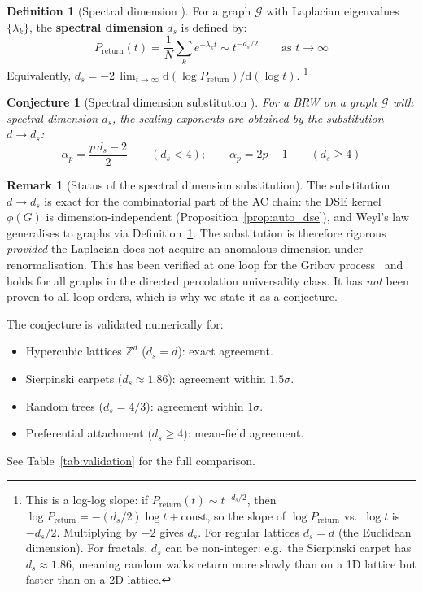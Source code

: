 \documentclass[11pt,a4paper]{article}
\newtheorem{conjecture}[theorem]{Conjecture}
\theoremstyle{definition}
\newtheorem{definition}[theorem]{Definition}
\newtheorem*{remark}{Remark}
\newcommand{\dd}{\mathrm{d}}
\newcommand{\Preturn}{P_{\mathrm{return}}}
\begin{document}
\begin{definition}[Spectral dimension {\cite{burioni2005}}]
\label{def:spectral_dim}
For a graph $\mathcal{G}$ with Laplacian eigenvalues $\{\lambda_k\}$,
the \textbf{spectral dimension} $d_s$ is defined by:
\begin{equation}
\Preturn(t) = \frac{1}{N}\sum_k e^{-\lambda_k t} \sim t^{-d_s/2}
\qquad\text{as } t \to \infty
\end{equation}
Equivalently, $d_s = -2\, \lim_{t \to \infty} \dd(\log \Preturn)/\dd(\log t)$.%
\footnote{This is a log-log slope: if $\Preturn(t) \sim t^{-d_s/2}$,
then $\log \Preturn = -(d_s/2)\log t + \mathrm{const}$, so the slope
of $\log \Preturn$ vs.\ $\log t$ is $-d_s/2$. Multiplying by $-2$ gives
$d_s$. For regular lattices $d_s = d$ (the Euclidean dimension).
For fractals, $d_s$ can be non-integer: e.g.\ the Sierpinski carpet has
$d_s \approx 1.86$, meaning random walks return more slowly than on a
1D lattice but faster than on a 2D lattice.}
\end{definition}

\begin{conjecture}[Spectral dimension substitution {\cite{bordeu2019}}]
\label{conj:spectral_sub}
For a BRW on a graph $\mathcal{G}$ with spectral dimension $d_s$,
the scaling exponents are obtained by the substitution $d \to d_s$:
\begin{equation}
\boxed{\alpha_p = \frac{p\,d_s - 2}{2} \qquad (d_s < 4); \qquad
\alpha_p = 2p - 1 \qquad (d_s \geq 4)}
\label{eq:brw_spectral}
\end{equation}
\end{conjecture}

\begin{remark}[Status of the spectral dimension substitution]
The substitution $d \to d_s$ is exact for the combinatorial part of the
AC chain: the DSE kernel $\phi(G)$ is dimension-independent
(Proposition~\ref{prop:auto_dse}), and Weyl's law generalises to graphs
via Definition~\ref{def:spectral_dim}. The substitution is therefore
rigorous \emph{provided} the Laplacian does not acquire an anomalous
dimension under renormalisation. This has been verified at one loop for
the Gribov process~\cite{amarteifio2019,bordeu2019} and holds for all
graphs in the directed percolation universality class. It has \emph{not}
been proven to all loop orders, which is why we state it as a conjecture.

The conjecture is validated numerically for:
\begin{itemize}
\item Hypercubic lattices $\mathbb{Z}^d$ ($d_s = d$): exact agreement.
\item Sierpinski carpets ($d_s \approx 1.86$): agreement within $1.5\sigma$.
\item Random trees ($d_s = 4/3$): agreement within $1\sigma$.
\item Preferential attachment ($d_s \geq 4$): mean-field agreement.
\end{itemize}
See Table~\ref{tab:validation} for the full comparison.
\end{remark}
\end{document}
